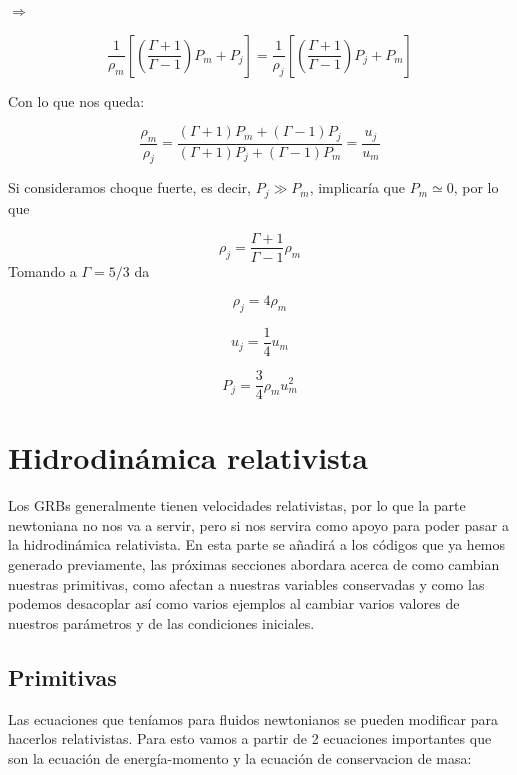 \documentclass[12pt,a4paper]{book}
\begin{document}
$\Rightarrow$

\begin{equation*}
\frac{1}{\rho_{m}} \left[  \left(\frac{\Gamma + 1}{\Gamma - 1} \right) P_{m} + P_{j} \right]
=
\frac{1}{\rho_{j}} \left[  \left(\frac{\Gamma + 1}{\Gamma - 1} \right) P_{j} + P_{m} \right]
\end{equation*}

Con lo que nos queda:

\begin{equation}\label{RH_no_rel_choque_no_fuerte}
\frac{\rho_{m}}{\rho_j} =
\frac{\left( \Gamma +1 \right) P_{m}+ \left( \Gamma -1 \right) P_{j
}}{\left(\Gamma +1 \right) P_{j}+ \left( \Gamma -1 \right) P_{m}}
= \frac{u_j}{u_m}
\end{equation}

Si consideramos choque fuerte, es decir, $P_j \gg P_m$, implicaría que $P_m \simeq 0$, por lo que

\begin{equation}
\rho_j = \frac{\Gamma +1}{\Gamma-1} \rho_m 
\end{equation}
Tomando a $\Gamma = 5/3$ da

\begin{equation}
\rho_j = 4 \rho_m
\end{equation}

\begin{equation}
u_j = \frac{1}{4} u_m
\end{equation}

\begin{equation}
P_{j} = \frac{3}{4}\rho_m u_m^{2}
\end{equation}


\section{Hidrodinámica relativista}
Los GRBs generalmente tienen velocidades relativistas, por lo que la parte newtoniana no nos va a servir, pero si nos servira como apoyo para poder pasar
a la hidrodinámica relativista.
En esta parte se añadirá a los códigos que ya hemos generado previamente, las próximas secciones abordara acerca de como cambian nuestras primitivas,
como afectan a nuestras variables conservadas y como las podemos desacoplar así como varios ejemplos al cambiar varios valores de nuestros parámetros y 
de las condiciones iniciales.

\subsection{Primitivas}
Las ecuaciones que teníamos para fluidos newtonianos se pueden modificar para hacerlos relativistas. Para esto vamos a partir de 2 ecuaciones importantes que son la ecuación de energía-momento y la ecuación de conservacion de masa:
\end{document}
